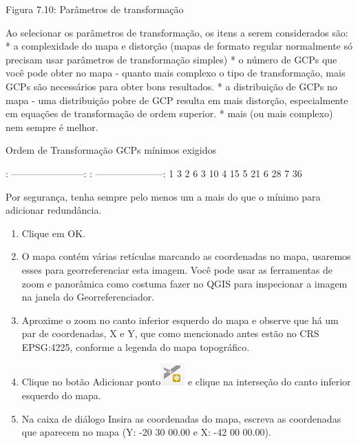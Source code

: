 \documentclass[
]{book}
\providecommand{\tightlist}{%
  \setlength{\itemsep}{0pt}\setlength{\parskip}{0pt}}
\begin{document}
Figura 7.10: Parâmetros de transformação

Ao selecionar os parâmetros de transformação, os itens a serem considerados são:
* a complexidade do mapa e distorção (mapas de formato regular normalmente só precisam usar parâmetros de transformação simples)
* o número de GCPs que você pode obter no mapa - quanto mais complexo o tipo de transformação, mais GCPs são necessários para obter bons resultados.
* a distribuição de GCPs no mapa - uma distribuição pobre de GCP resulta em mais distorção, especialmente em equações de transformação de ordem superior.
* mais (ou mais complexo) nem sempre é melhor.

Ordem de Transformação \textbar{} GCPs mínimos exigidos \textbar{}

\textbar: -----------------------: \textbar: ---------------------: \textbar{}
\textbar{} 1 \textbar{} 3 \textbar{}
\textbar{} 2 \textbar{} 6 \textbar{}
\textbar{} 3 \textbar{} 10 \textbar{}
\textbar{} 4 \textbar{} 15 \textbar{}
\textbar{} 5 \textbar{} 21 \textbar{}
\textbar{} 6 \textbar{} 28 \textbar{}
\textbar{} 7 \textbar{} 36 \textbar{}

Por segurança, tenha sempre pelo menos um a mais do que o mínimo para adicionar redundância.

\begin{enumerate}
\def\labelenumi{\arabic{enumi}.}
\setcounter{enumi}{5}
\tightlist
\item
  Clique em OK.
\item
  O mapa contém várias retículas marcando as coordenadas no mapa, usaremos esses para georreferenciar esta imagem. Você pode usar as ferramentas de zoom e panorâmica como costuma fazer no QGIS para inspecionar a imagem na janela do Georreferenciador.
\item
  Aproxime o zoom no canto inferior esquerdo do mapa e observe que há um par de coordenadas, X e Y, que como mencionado antes estão no CRS EPSG:4225, conforme a legenda do mapa topográfico.
\item
  Clique no botão Adicionar ponto\includegraphics{media/modulo7/add-point.png} e clique na interseção do canto inferior esquerdo do mapa.
\item
  Na caixa de diálogo Insira as coordenadas do mapa, escreva as coordenadas que aparecem no mapa (Y: -20 30 00.00 e X: -42 00 00.00).
\end{enumerate}
\end{document}

